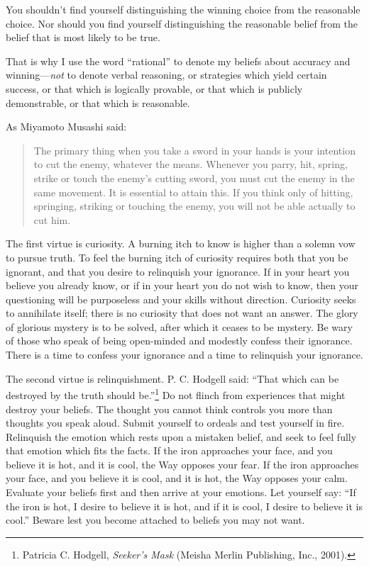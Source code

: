 {
 You shouldn't find yourself distinguishing the
winning choice from the reasonable choice. Nor should you find yourself
distinguishing the reasonable belief from the belief that is most
likely to be true.}

{
 That is why I use the word
``rational'' to denote my beliefs
about accuracy and winning---\textit{not} to denote verbal reasoning,
or strategies which yield certain success, or that which is logically
provable, or that which is publicly demonstrable, or that which is
reasonable.}

{
 As Miyamoto Musashi said:}

\begin{quote}
{
 The primary thing when you take a sword in your hands is your
intention to cut the enemy, whatever the means. Whenever you parry,
hit, spring, strike or touch the enemy's cutting sword,
you must cut the enemy in the same movement. It is essential to attain
this. If you think only of hitting, springing, striking or touching the
enemy, you will not be able actually to cut him.}
\end{quote}

\myendsectiontext


{
 The first virtue is curiosity. A burning itch to know is higher
than a solemn vow to pursue truth. To feel the burning itch of
curiosity requires both that you be ignorant, and that you desire to
relinquish your ignorance. If in your heart you believe you already
know, or if in your heart you do not wish to know, then your
questioning will be purposeless and your skills without direction.
Curiosity seeks to annihilate itself; there is no curiosity that does
not want an answer. The glory of glorious mystery is to be solved,
after which it ceases to be mystery. Be wary of those who speak of
being open-minded and modestly confess their ignorance. There is a time
to confess your ignorance and a time to relinquish your ignorance.}

{
 The second virtue is relinquishment. P. C. Hodgell said:
``That which can be destroyed by the truth should
be.''\footnote{Patricia C. Hodgell, \textit{Seeker's Mask}
(Meisha Merlin Publishing, Inc., 2001).} Do not flinch from
experiences that might destroy your beliefs. The thought you cannot
think controls you more than thoughts you speak aloud. Submit yourself
to ordeals and test yourself in fire. Relinquish the emotion which
rests upon a mistaken belief, and seek to feel fully that emotion which
fits the facts. If the iron approaches your face, and you believe it is
hot, and it is cool, the Way opposes your fear. If the iron approaches
your face, and you believe it is cool, and it is hot, the Way opposes
your calm. Evaluate your beliefs first and then arrive at your
emotions. Let yourself say: ``If the iron is hot, I
desire to believe it is hot, and if it is cool, I desire to believe it
is cool.'' Beware lest you become attached to beliefs
you may not want.}

